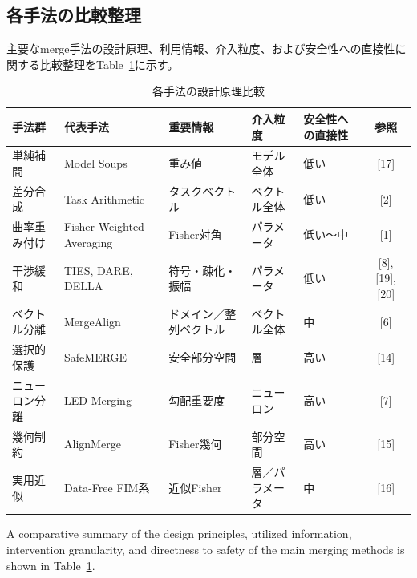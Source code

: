 \documentclass{article}
\begin{document}
\subsection{各手法の比較整理}
主要なmerge手法の設計原理、利用情報、介入粒度、および安全性への直接性に関する比較整理をTable~\ref{tab:method_comparison}に示す。
\begin{table}[t]
\centering
\caption{各手法の設計原理比較}
\label{tab:method_comparison}
\small
\begin{tabular}{p{2.0cm}p{2.4cm}p{2.5cm}p{2.0cm}p{2.2cm}c}
\toprule
手法群 & 代表手法 & 重要情報 & 介入粒度 & 安全性への直接性 & 参照 \\
\midrule
単純補間 & Model Soups & 重み値 & モデル全体 & 低い & [17] \\

差分合成 & Task Arithmetic & タスクベクトル & ベクトル全体 & 低い & [2] \\

曲率重み付け & Fisher-Weighted Averaging & Fisher対角 & パラメータ & 低い〜中 & [1] \\

干渉緩和 & TIES, DARE, DELLA & 符号・疎化・振幅 & パラメータ & 低い & [8], [19], [20] \\

ベクトル分離 & MergeAlign & ドメイン／整列ベクトル & ベクトル全体 & 中 & [6] \\

選択的保護 & SafeMERGE & 安全部分空間 & 層 & 高い & [14] \\

ニューロン分離 & LED-Merging & 勾配重要度 & ニューロン & 高い & [7] \\

幾何制約 & AlignMerge & Fisher幾何 & 部分空間 & 高い & [15] \\

実用近似 & Data-Free FIM系 & 近似Fisher & 層／パラメータ & 中 & [16] \\
\bottomrule
\end{tabular}
\end{table}


A comparative summary of the design principles, utilized information, intervention granularity, and directness to safety of the main merging methods is shown in Table~\ref{tab:method_comparison}.
\end{document}
